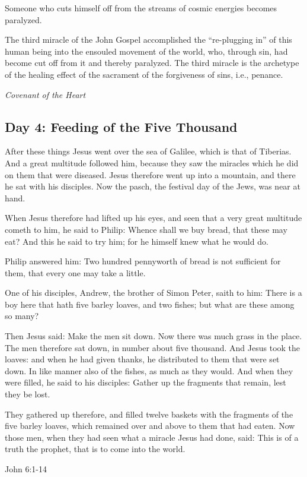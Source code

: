 Someone who cuts himself off from the streams of cosmic energies becomes paralyzed.

\begin{quotationx}
The third miracle of the John Gospel accomplished the “re-plugging in” of this human being into the ensouled movement of
the world, who, through sin, had become cut off from it and thereby paralyzed. The third miracle is the archetype of
the healing effect of the sacrament of the forgiveness of sins, i.e., penance. \begin{flushright} \emph{Covenant of the Heart}\end{flushright}

\end{quotationx}
\subsection*{Day 4: Feeding of the Five Thousand}
After these things Jesus went over the sea of Galilee, which is that of Tiberias. And a great multitude followed him,
because they saw the miracles which he did on them that were diseased. Jesus therefore went up into a mountain, and
there he sat with his disciples. Now the pasch, the festival day of the Jews, was near at hand.

When Jesus therefore had lifted up his eyes, and seen that a very great multitude cometh to him, he said to Philip:
Whence shall we buy bread, that these may eat? And this he said to try him; for he himself knew what he would do.

Philip answered him: Two hundred pennyworth of bread is not sufficient for them, that every one may take a little.

One of his disciples, Andrew, the brother of Simon Peter, saith to him: There is a boy here that hath five barley
loaves, and two fishes; but what are these among so many?

Then Jesus said: Make the men sit down. Now there was much grass in the place. The men therefore sat down, in number
about five thousand. And Jesus took the loaves: and when he had given thanks, he distributed to them that were set
down. In like manner also of the fishes, as much as they would. And when they were filled, he said to his disciples:
Gather up the fragments that remain, lest they be lost.

They gathered up therefore, and filled twelve baskets with the fragments of the five barley loaves, which remained over
and above to them that had eaten. Now those men, when they had seen what a miracle Jesus had done, said: This is of a
truth the prophet, that is to come into the world. \begin{flushright} John 6:1-14\end{flushright}

